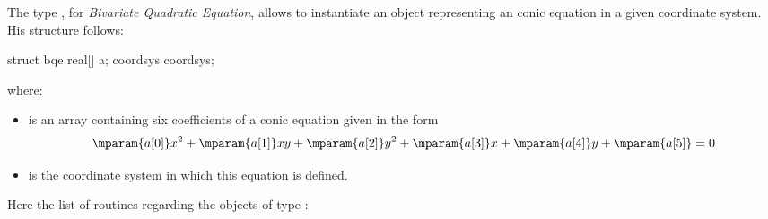 \documentclass[pdftex]{article}
\begin{document}
The type , for \emph{Bivariate Quadratic Equation}, allows
to instantiate an object representing an conic equation in a given
coordinate system.  His structure follows:
\begin{center}
  \begin{Vcolor}
    struct bqe
    {
      real[] a;
      coordsys coordsys;
    }
  \end{Vcolor}
\end{center}
\noindent where:
\begin{itemize}
\item {} is an array containing six coefficients of a conic equation
  given in the form \[\mparam{a[0]}x^2 + \mparam{a[1]}xy + \mparam{a[2]}y^2 + \mparam{a[3]}x + \mparam{a[4]}y + \mparam{a[5]}=0\]
\item {} is the coordinate system in which this
  equation is defined.
\end{itemize}
Here the list of routines regarding the objects of type :
\end{document}

